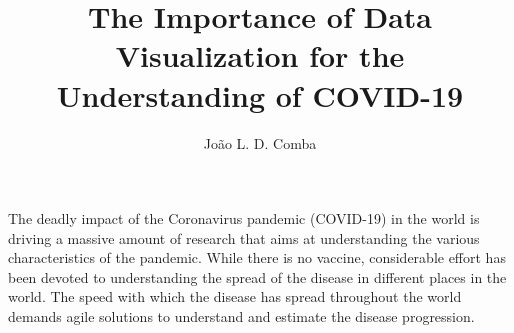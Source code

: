 \documentclass[10pt,journal,compsoc]{IEEEtran}
\newcommand{\cv}{COVID-19\xspace}
\begin{document}
\title{The Importance of Data Visualization for the Understanding of \cv}



\author{%
	João L. D. Comba
	}




\maketitle



The deadly impact of the Coronavirus pandemic (\cv) in the world is driving a massive amount of research that aims at understanding the various characteristics of the pandemic. While there is no vaccine, considerable effort has been devoted to understanding the spread of the disease in different places in the world. The speed with which the disease has spread throughout the world demands agile solutions to understand and estimate the disease progression. 
\end{document}
